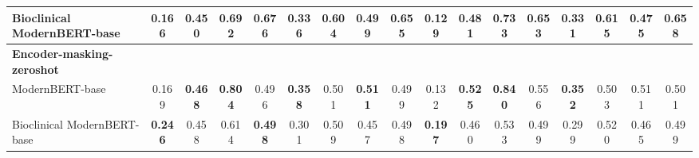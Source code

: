 \begin{table}[htbp]
\begin{ChSevenFloatBody}
{\begin{tabular}{lcccccccc|cccccccc}
Bioclinical ModernBERT-base & 0.166 & 0.450 & 0.692 & \textbf{0.676} & 0.336 & 0.604 & 0.499 & \textbf{0.655} & 0.129 & 0.481 & 0.733 & 0.653 & 0.331 & \textbf{0.615} & 0.475 & \textbf{0.658} \\ 
\hline
\textbf{Encoder-masking-zeroshot} &&&&&&&&&&&&&&&&\\
ModernBERT-base & 0.169 & \textbf{0.468} & \textbf{0.804} & 0.496 & \textbf{0.358} & 0.501 & \textbf{0.511} & 0.499 & 0.132 & \textbf{0.525} & \textbf{0.840} & 0.556 & \textbf{0.352} & 0.503 & 0.511 & 0.501 \\
Bioclinical ModernBERT-base & \textbf{0.246} & 0.458 & 0.614 & \textbf{0.498} & 0.301 & 0.509 & 0.457 & 0.498 & \textbf{0.197} & 0.460 & 0.533 & 0.499 & 0.299 & 0.520 & 0.465 & 0.499 \\
\bottomrule
\end{tabular}
}



\end{ChSevenFloatBody}
\end{table}